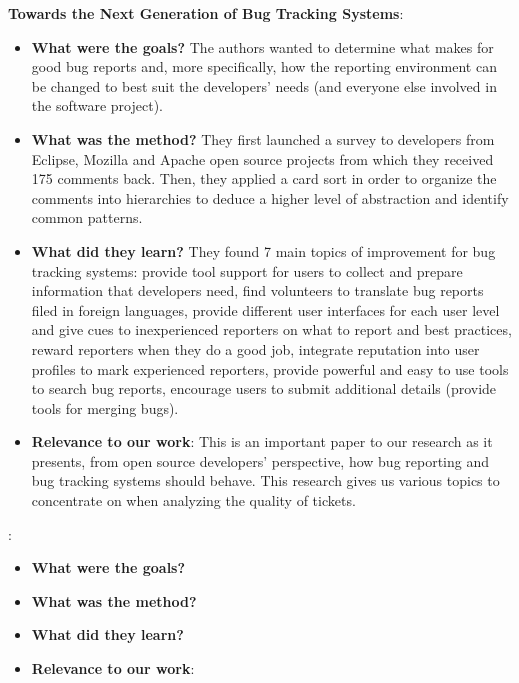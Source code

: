 \documentclass{mprop}
\begin{document}
\textbf{Towards the Next Generation of Bug Tracking Systems}\cite{just2008towards}:
\begin{itemize}
  \item \textbf{What were the goals?}
  The authors wanted to determine what makes for good bug reports and, more specifically, how the reporting environment can be changed to best suit the developers’ needs (and everyone else involved in the software project). 
  \item \textbf{What was the method?}
  They first launched a survey to developers from Eclipse, Mozilla and Apache open source projects from which they received 175 comments back. Then, they applied a card sort in order to organize the comments into hierarchies to deduce a higher level of abstraction and identify common patterns. 
  \item \textbf{What did they learn?}
  They found 7 main topics of improvement for bug tracking systems: provide tool support for users to collect and prepare information that developers need, find volunteers to translate bug reports filed in foreign languages, provide different user interfaces for each user level and give cues to inexperienced reporters on what to report and best practices, reward reporters when they do a good job, integrate reputation into user profiles to mark experienced reporters, provide powerful and easy to use tools to search bug reports, encourage users to submit additional details (provide tools for merging bugs). 
  \item \textbf{Relevance to our work}:
  This is an important paper to our research as it presents, from open source developers’ perspective, how bug reporting and bug tracking systems should behave. This research gives us various topics to concentrate on when analyzing the quality of tickets. 
\end{itemize}

\textbf{}\cite{}:
\begin{itemize}
  \item \textbf{What were the goals?}
  \item \textbf{What was the method?}
  \item \textbf{What did they learn?}
  \item \textbf{Relevance to our work}:
\end{itemize}
\end{document}
